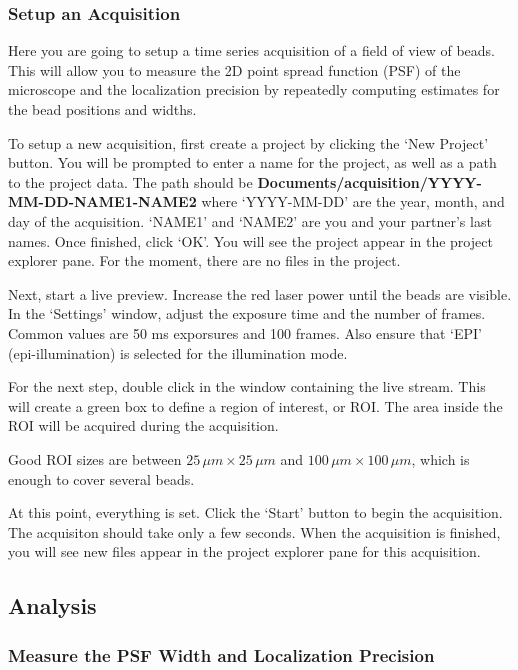 \documentclass[10pt,a4paper,oneside]{book}
\begin{document}
\subsubsection{Setup an Acquisition}

Here you are going to setup a time series acquisition of a field of view of beads. This will allow you to measure the 2D point spread function (PSF) of the microscope and the localization precision by repeatedly computing estimates for the bead positions and widths.

To setup a new acquisition, first create a project by clicking the `New Project' button. You will be prompted to enter a name for the project, as well as a path to the project data. The path should be \textbf{Documents/acquisition/YYYY-MM-DD-NAME1-NAME2} where `YYYY-MM-DD' are the year, month, and day of the acquisition. `NAME1' and `NAME2' are you and your partner's last names. Once finished, click `OK'. You will see the project appear in the project explorer pane. For the moment, there are no files in the project.

Next, start a live preview. Increase the red laser power until the beads are visible. In the `Settings' window, adjust the exposure time and the number of frames. Common values are 50 ms exporsures and 100 frames. Also ensure that `EPI' (epi-illumination) is selected for the illumination mode.

For the next step, double click in the window containing the live stream. This will create a green box to define a region of interest, or ROI. The area inside the ROI will be acquired during the acquisition.

Good ROI sizes are between $25 \, \mu m\times 25 \, \mu m$ and $100 \, \mu m\times 100 \, \mu m$, which is enough to cover several beads.

At this point, everything is set. Click the `Start' button to begin the acquisition. The acquisiton should take only a few seconds. When the acquisition is finished, you will see new files appear in the project explorer pane for this acquisition.

\subsection{Analysis}

\subsubsection{Measure the PSF Width and Localization Precision}
\end{document}
